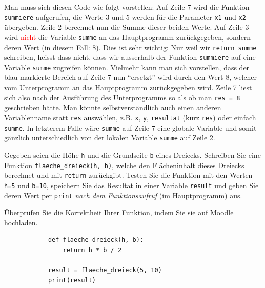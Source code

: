 \begin{myexample}
\begin{myattention}
	Man muss sich diesen Code wie folgt vorstellen: Auf Zeile 7 wird die Funktion \lstinline|summiere| aufgerufen, die Werte 3 und 5 werden für die Parameter \lstinline|x1| und \lstinline|x2| übergeben. Zeile 2 berechnet nun die Summe dieser beiden Werte. Auf Zeile 3 wird \textcolor{red}{nicht} die Variable \lstinline|summe| an das Hauptprogramm zurückgegeben, sondern deren Wert (in diesem Fall: 8). Dies ist sehr wichtig: Nur weil wir \lstinline|return summe| schreiben, heisst dass nicht, dass wir ausserhalb der Funktion \lstinline|summiere| auf eine Variable \lstinline|summe| zugreifen können. Vielmehr kann man sich vorstellen, dass der blau markierte Bereich auf Zeile 7 nun \enquote{ersetzt} wird durch den Wert 8, welcher vom Unterprogramm an das Hauptprogramm zurückgegeben wird. Zeile 7 liest sich also nach der Ausführung des Unterprogramms so als ob man \lstinline|res = 8| geschrieben hätte. Man könnte selbstverständlich auch einen anderen Variablenname statt \lstinline|res| auswählen, z.B. \lstinline|x|, \lstinline|y|, \lstinline|resultat| (kurz  \lstinline|res|) oder einfach \lstinline|summe|. In letzterem Falle wäre \lstinline|summe| auf Zeile 7 eine globale Variable und somit gänzlich unterschiedlich von der lokalen Variable \lstinline|summe| auf Zeile 2.
\end{myattention}
\end{myexample}

\begin{myexercise}\label{ex:dreieck-return}
	Gegeben seien die Höhe \texttt{h} und die Grundseite \texttt{b} eines Dreiecks. Schreiben Sie eine Funktion \lstinline|flaeche_dreieck(h, b)|, welche den Flächeninhalt dieses Dreiecks berechnet und mit \lstinline|return| zurückgibt. Testen Sie die Funktion mit den Werten \lstinline|h=5| und \lstinline|b=10|, speichern Sie das Resultat in einer Variable \lstinline|result| und geben Sie deren Wert per \lstinline|print| \textit{nach dem Funktionsaufruf} (im Hauptprogramm) aus.

	Überprüfen Sie die Korrektheit Ihrer Funktion, indem Sie sie auf Moodle hochladen.
	\begin{myanswer}
		\begin{lstlisting}
			def flaeche_dreieck(h, b):
				return h * b / 2

			result = flaeche_dreieck(5, 10)
			print(result)
	\end{lstlisting}
	\end{myanswer}
\end{myexercise}

